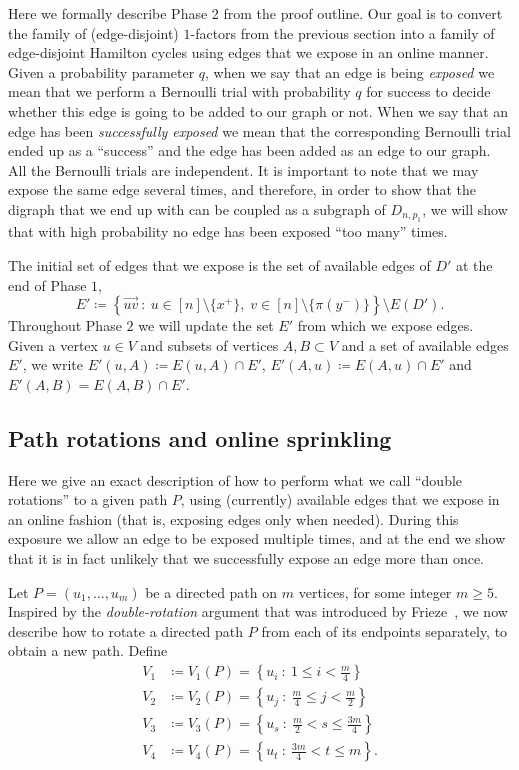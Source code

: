 \documentclass{article}
\begin{document}
	Here we formally describe Phase 2 from the proof outline. 
	Our goal is to convert the family of (edge-disjoint) $1$-factors from the previous section into a family of edge-disjoint Hamilton cycles using edges that we expose in an online manner.
	Given a probability parameter $q$, when we say that an edge is being \emph{exposed} we mean that we perform a Bernoulli trial with probability $q$ for success to decide whether this edge is going to be added to our graph or not.
	When we say that an edge has been \emph{successfully exposed} we mean that the corresponding Bernoulli trial ended up as a ``success'' and the edge has been added as an edge to our graph.
	All the Bernoulli trials are independent.
	It is important to note that we may expose the same edge several times, and therefore, in order to show that the digraph that we end up with can be coupled as a subgraph of $D_{n,p_1}$, we will show that with high probability no edge has been exposed ``too many'' times.
	
	The initial set of edges that we expose is the set of available edges of $D'$ at the end of Phase $1$,
	\[E' \coloneqq \left\{\overrightarrow{uv} ~:~ u \in [n]\setminus \{x^+ \}, \; v \in [n]\setminus \{\pi(y^-) \} \right\} \setminus E(D'). \]
	Throughout Phase $2$ we will update the set $E'$ from which we expose edges.
	Given a vertex $u \in V$ and subsets of vertices $A, B \subset V$ and a set of available edges $E'$, we write $E'(u,A) \coloneqq E(u,A) \cap E'$, $E'(A,u) \coloneqq E(A,u) \cap E'$ and $E'(A,B) = E(A,B) \cap E'$.
	
	
	\subsection{Path rotations and online sprinkling}	
	Here we give an exact description of how to perform what we call ``double rotations'' to a given path $P$, using (currently) available edges that we expose in an online fashion (that is, exposing edges only when needed).
	During this exposure we allow an edge to be exposed multiple times, and at the end we show that it is in fact unlikely that we successfully expose an edge more than once.
	
	Let $P = (u_1, \ldots, u_m)$ be a directed path on $m$ vertices, for some integer $m \ge 5$.
	Inspired by the \emph{double-rotation} argument that was introduced by Frieze~\cite{frieze1988algorithm}, we now describe how to rotate a directed path $P$ from each of its endpoints separately, to obtain a new path.
	Define
	\begin{align*}
	V_1 &\coloneqq V_1(P) = \left\{u_i ~:~ 1\le i < \frac{m}{4} \right\} \\
	V_2 &\coloneqq V_2(P) = \left\{u_j ~:~ \frac{m}{4} \le j < \frac{m}{2} \right\} \\
	V_3 &\coloneqq V_3(P) = \left\{u_s ~:~ \frac{m}{2} < s \le \frac{3m}{4} \right\} \\
	V_4 &\coloneqq V_4(P) = \left\{u_t ~:~ \frac{3m}{4} < t \le m \right\}.
	\end{align*}
	
\end{document}
